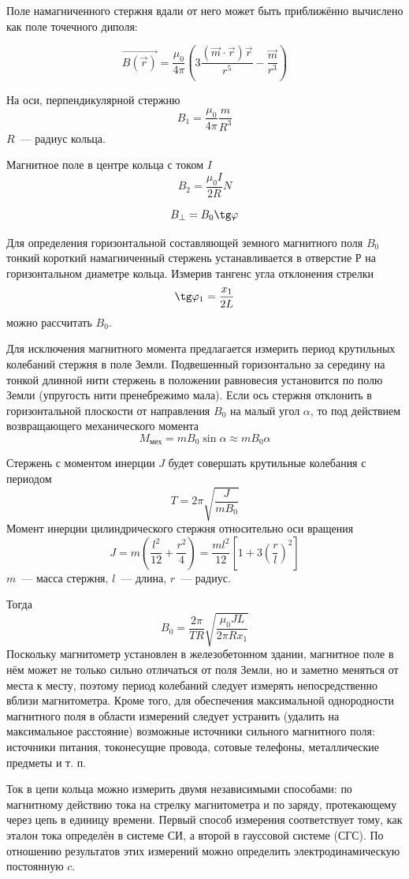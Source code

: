 Поле намагниченного стержня вдали от него может быть приближённо вычислено как поле точечного диполя:

\[
    \vec{B(\vec{r})} = \frac{ \mu_{0}}{4 \pi}\left(3\frac{\left(\vec{m}\cdot\vec{r}\right)\vec{r}}{r^{5}} - \frac{\vec{m}}{r^{3}}\right)
\]

На оси, перпендикулярной стержню
\[
    B_{1} = \frac{ \mu_{0}}{4 \pi}\frac{m}{R^{3}}
\]
$R$~--- радиус кольца.

Магнитное поле в центре кольца с током $I$
\[
    B_{2} = \frac{ \mu_{0} I}{2R} N
\]

\[
    B_{\bot} = B_{0}\tg \varphi
\]

Для определения горизонтальной составляющей земного магнитного поля $B_{0}$ тонкий короткий намагниченный стержень устанавливается в отверстие Р  на горизонтальном диаметре кольца. Измерив тангенс угла отклонения стрелки
\[
    \tg \varphi_{1} = \frac{x_{1}}{2L}
\]
можно рассчитать $B_{0}$.

Для исключения магнитного момента предлагается измерить период крутильных колебаний стержня в поле Земли. Подвешенный горизонтально за середину на тонкой длинной нити стержень в положении равновесия установится по полю Земли (упругость нити пренебрежимо мала). Если ось стержня отклонить в горизонтальной плоскости от направления $B_{0}$ на малый угол $ \alpha$, то под действием возвращающего механического момента
\[
    M_{\text{мех}} = mB_{0}\sin \alpha \approx mB_{0} \alpha
\]

Стержень с моментом инерции $J$ будет совершать крутильные колебания с периодом
\[
    T=2 \pi \sqrt{\frac{J}{mB_{0}}}
\]
Момент инерции цилиндрического стержня относительно оси вращения
\[
    J=m\left(\frac{l^{2}}{12} + \frac{r^{2}}{4}\right) = \frac{ml^{2}}{12}\left[1+3\left(\frac{r}{l}\right)^{2}\right]
\]
$m$~--- масса стержня, $l$~--- длина, $r$~--- радиус.

Тогда
\[
    B_{0} = \frac{2 \pi}{TR}\sqrt{\frac{ \mu_{0}JL}{2 \pi Rx_{1}}}
\]
Поскольку магнитометр установлен в железобетонном здании, магнитное поле в нём может не только сильно отличаться от поля Земли, но и заметно меняться от места к месту, поэтому период колебаний следует измерять непосредственно вблизи магнитометра. Кроме того, для обеспечения максимальной однородности магнитного поля в области измерений следует устранить (удалить на максимальное расстояние) возможные источники сильного магнитного поля: источники питания, токонесущие провода, сотовые телефоны, металлические предметы и т. п.

Ток в цепи кольца можно измерить двумя независимыми способами: по магнитному действию тока на стрелку магнитометра и по заряду, протекающему через цепь в единицу времени. Первый способ измерения соответствует тому, как эталон тока определён в системе СИ, а второй в гауссовой системе (СГС). По отношению результатов этих измерений можно определить электродинамическую постоянную $c$.


